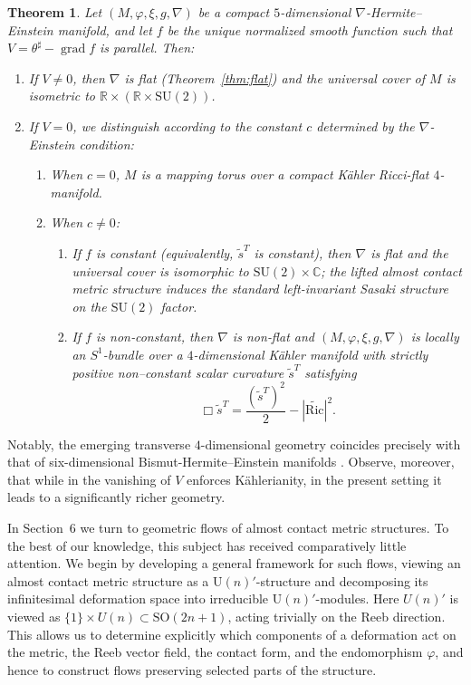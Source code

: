 \documentclass{article}
\newtheorem{thm}{Theorem}[section]
\theoremstyle{definition}
\newcommand{\SO}{\mathrm{SO}}
\renewcommand{\phi}{\varphi}
\numberwithin{equation}{section}
\begin{document}
\begin{thm} \label{thm:5 intro}
Let $(M,\phi,\xi,g,\nabla)$ be a compact $5$-dimensional $\nabla$-Hermite–Einstein manifold, and let $f$ be the unique normalized smooth function such that $V = \theta^{\sharp} - \operatorname{grad} f$ is parallel. Then:

\begin{enumerate}
\item If $V \neq 0$, then $\nabla$ is flat (Theorem~\ref{thm:flat}) and the universal cover of $M$ is isometric to $\mathbb{R} \times (\mathbb{R} \times \mathrm{SU}(2))$.

\item If $V = 0$, we distinguish according to the constant $c$ determined by the $\nabla$-Einstein condition:
\begin{enumerate}
    \item When $c = 0$, $M$ is a mapping torus over a compact K\"ahler Ricci-flat $4$-manifold.
    \item When $c \neq 0$:
    \begin{enumerate}
        \item If $f$ is constant (equivalently, $\tilde s^T$ is constant), then $\nabla$ is flat and the universal cover is isomorphic to $\mathrm{SU}(2) \times \mathbb{C}$; the lifted almost contact metric structure induces the standard left-invariant Sasaki structure on the $\mathrm{SU}(2)$ factor.
        \item If $f$ is non‑constant, then $\nabla$ is non‑flat and $(M,\phi,\xi,g,\nabla)$ is locally an $S^1$-bundle over a $4$-dimensional K\"ahler manifold with strictly positive non--constant scalar curvature $\tilde s^T$ satisfying
        \[
        \Box \tilde s^T  = \frac{(\tilde s^T)^2}{2} - |\widetilde{\mathrm{Ric}}|^2.
        \]
    \end{enumerate}
\end{enumerate}
\end{enumerate}
\end{thm}

Notably, the emerging transverse $4$-dimensional geometry coincides precisely with that of six-dimensional Bismut-Hermite--Einstein manifolds \cite{ABLS}. Observe, moreover, that while in \cite{ABLS} the vanishing of $V$ enforces  K\"ahlerianity, in the present setting it leads to a significantly richer geometry.\par
\medskip
In Section~6 we turn to geometric flows of almost contact metric structures. To the best of our knowledge, this subject has received comparatively little attention. We begin by developing a general framework for such flows, viewing an almost contact metric structure as a $\mathrm{U}(n)'$-structure and decomposing its infinitesimal deformation space into irreducible $\mathrm{U}(n)'$-modules. Here $U(n)'$ is viewed as $\{1\}\times U(n)\subset \SO(2n+1)$,
acting trivially on the Reeb direction. This allows us to determine explicitly which components of a deformation act on the metric, the Reeb vector field, the contact form, and the endomorphism $\phi$, and hence to construct flows preserving selected parts of the structure.
\end{document}
